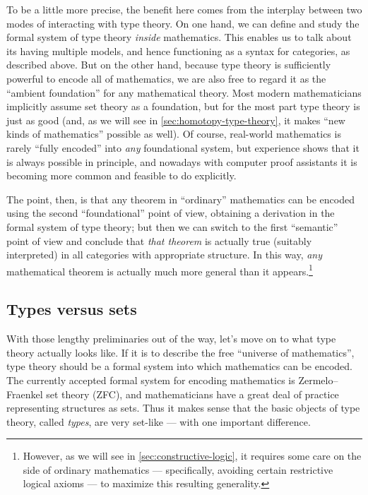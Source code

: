\documentclass[10pt]{article}
\numberwithin{equation}{section}
\begin{document}
To be a little more precise, the benefit here comes from the interplay between two modes of interacting with type theory.
On one hand, we can define and study the formal system of type theory \emph{inside} mathematics.
This enables us to talk about its having multiple models, and hence functioning as a syntax for categories, as described above.
But on the other hand, because type theory is sufficiently powerful to encode all of mathematics, we are also free to regard it as the ``ambient foundation'' for any mathematical theory.
Most modern mathematicians implicitly assume set theory as a foundation, but for the most part type theory is just as good (and, as we will see in \cref{sec:homotopy-type-theory}, it makes ``new kinds of mathematics'' possible as well).
Of course, real-world mathematics is rarely ``fully encoded'' into \emph{any} foundational system, but experience shows that it is always possible in principle, and nowadays with computer proof assistants it is becoming more common and feasible to do explicitly.

The point, then, is that any theorem in ``ordinary'' mathematics can be encoded using the second ``foundational'' point of view, obtaining a derivation in the formal system of type theory; but then we can switch to the first ``semantic'' point of view and conclude that \emph{that theorem} is actually true (suitably interpreted) in all categories with appropriate structure.
In this way, \emph{any} mathematical theorem is actually much more general than it appears.\footnote{However, as we will see in \cref{sec:constructive-logic}, it requires some care on the side of ordinary mathematics --- specifically, avoiding certain restrictive logical axioms --- to maximize this resulting generality.}


\subsection{Types versus sets}
\label{sec:types-versus-sets}

With those lengthy preliminaries out of the way, let's move on to what type theory actually looks like.
If it is to describe the free ``universe of mathematics'', type theory should be a formal system into which mathematics can be encoded.
The currently accepted formal system for encoding mathematics is Zermelo--Fraenkel set theory (ZFC), and mathematicians have a great deal of practice representing structures as sets.
Thus it makes sense that the basic objects of type theory, called \emph{types}, are very set-like --- with one important difference.
\end{document}
